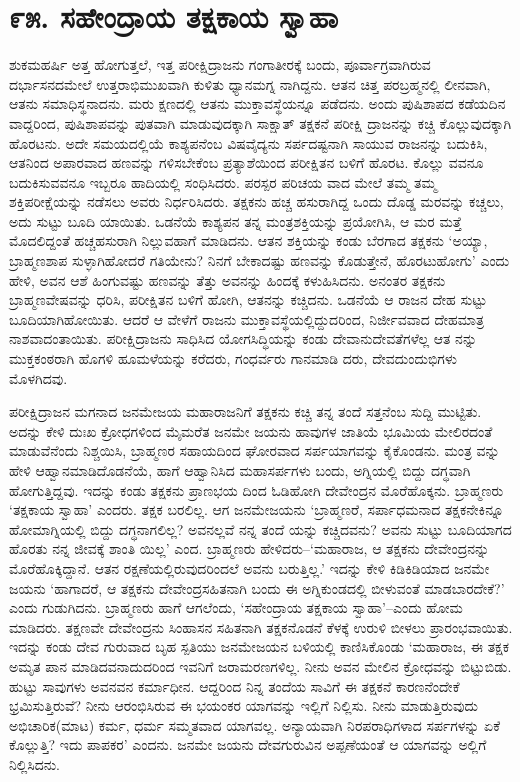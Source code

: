 
\chapter{೯೫. ಸಹೇಂದ್ರಾಯ ತಕ್ಷಕಾಯ ಸ್ವಾಹಾ}

ಶುಕಮಹರ್ಷಿ ಅತ್ತ ಹೋಗುತ್ತಲೆ, ಇತ್ತ ಪರೀಕ್ಷಿದ್ರಾಜನು ಗಂಗಾತೀರಕ್ಕೆ ಬಂದು, ಪೂರ್ವಾಗ್ರವಾಗಿರುವ ದರ್ಭಾಸನದಮೇಲೆ ಉತ್ತರಾಭಿಮುಖವಾಗಿ ಕುಳಿತು ಧ್ಯಾನಮಗ್ನ ನಾಗಿದ್ದನು. ಆತನ ಚಿತ್ತ ಪರಬ್ರಹ್ಮನಲ್ಲಿ ಲೀನವಾಗಿ, ಆತನು ಸಮಾಧಿಸ್ಥನಾದನು. ಮರು ಕ್ಷಣದಲ್ಲಿ ಆತನು ಮುಕ್ತಾವಸ್ಥೆಯನ್ನೂ ಪಡೆದನು. ಅಂದು ಪುಷಿಶಾಪದ ಕಡೆಯದಿನ ವಾದ್ದರಿಂದ, ಪುಷಿಶಾಪವನ್ನು ಪುತವಾಗಿ ಮಾಡುವುದಕ್ಕಾಗಿ ಸಾಕ್ಷಾತ್ ತಕ್ಷಕನೆ ಪರೀಕ್ಷಿ ದ್ರಾಜನನ್ನು ಕಚ್ಚಿ ಕೊಲ್ಲುವುದಕ್ಕಾಗಿ ಹೊರಟನು. ಅದೇ ಸಮಯದಲ್ಲಿಯೆ ಕಾಶ್ಯಪನೆಂಬ ವಿಷವೈದ್ಯನು ಸರ್ಪದಷ್ಟನಾಗಿ ಸಾಯುವ ರಾಜನನ್ನು ಬದುಕಿಸಿ, ಆತನಿಂದ ಅಪಾರವಾದ ಹಣವನ್ನು ಗಳಿಸಬೇಕೆಂಬ ಪ್ರತ್ಯಾಶೆಯಿಂದ ಪರೀಕ್ಷಿತನ ಬಳಿಗೆ ಹೊರಟ. ಕೊಲ್ಲು ವವನೂ ಬದುಕಿಸುವವನೂ ಇಬ್ಬರೂ ಹಾದಿಯಲ್ಲಿ ಸಂಧಿಸಿದರು. ಪರಸ್ಪರ ಪರಿಚಯ ವಾದ ಮೇಲೆ ತಮ್ಮ ತಮ್ಮ ಶಕ್ತಿಪರೀಕ್ಷೆಯನ್ನು ನಡೆಸಲು ಅವರು ನಿರ್ಧರಿಸಿದರು. ತಕ್ಷಕನು ಹಚ್ಚ ಹಸುರಾಗಿದ್ದ ಒಂದು ದೊಡ್ಡ ಮರವನ್ನು ಕಚ್ಚಲು, ಅದು ಸುಟ್ಟು ಬೂದಿ ಯಾಯಿತು. ಒಡನೆಯೆ ಕಾಶ್ಯಪನ ತನ್ನ ಮಂತ್ರಶಕ್ತಿಯನ್ನು ಪ್ರಯೋಗಿಸಿ, ಆ ಮರ ಮತ್ತೆ ಮೊದಲಿದ್ದಂತೆ ಹಚ್ಚಹಸುರಾಗಿ ನಿಲ್ಲುವಹಾಗೆ ಮಾಡಿದನು. ಆತನ ಶಕ್ತಿಯನ್ನು ಕಂಡು ಬೆರಗಾದ ತಕ್ಷಕನು ‘ಅಯ್ಯಾ, ಬ್ರಾಹ್ಮಣಶಾಪ ಸುಳ್ಳಾಗಿಹೋದರೆ ಗತಿಯೇನು? ನಿನಗೆ ಬೇಕಾದಷ್ಟು ಹಣವನ್ನು ಕೊಡುತ್ತೇನೆ, ಹೊರಟುಹೋಗು’ ಎಂದು ಹೇಳಿ, ಅವನ ಆಶೆ ಹಿಂಗುವಷ್ಟು ಹಣವನ್ನು ತೆತ್ತು ಅವನನ್ನು ಹಿಂದಕ್ಕೆ ಕಳುಹಿಸಿದನು. ಅನಂತರ ತಕ್ಷಕನು ಬ್ರಾಹ್ಮಣವೇಷವನ್ನು ಧರಿಸಿ, ಪರೀಕ್ಷಿತನ ಬಳಿಗೆ ಹೋಗಿ, ಆತನನ್ನು ಕಚ್ಚಿದನು. ಒಡನೆಯೆ ಆ ರಾಜನ ದೇಹ ಸುಟ್ಟು ಬೂದಿಯಾಗಿಹೋಯಿತು. ಆದರೆ ಆ ವೇಳೆಗೆ ರಾಜನು ಮುಕ್ತಾವಸ್ಥೆಯಲ್ಲಿದ್ದುದರಿಂದ, ನಿರ್ಜೀವವಾದ ದೇಹಮಾತ್ರ ನಾಶವಾದಂತಾಯಿತು. ಪರೀಕ್ಷಿದ್ರಾಜನು ಸಾಧಿಸಿದ ಯೋಗಸಿದ್ಧಿಯನ್ನು ಕಂಡು ದೇವಾನುದೇವತೆಗಳೆಲ್ಲ ಆತ ನನ್ನು ಮುಕ್ತಕಂಠರಾಗಿ ಹೊಗಳಿ ಹೂಮಳೆಯನ್ನು ಕರೆದರು, ಗಂಧರ್ವರು ಗಾನಮಾಡಿ ದರು, ದೇವದುಂದುಭಿಗಳು ಮೊಳಗಿದವು.

ಪರೀಕ್ಷಿದ್ರಾಜನ ಮಗನಾದ ಜನಮೇಜಯ ಮಹಾರಾಜನಿಗೆ ತಕ್ಷಕನು ಕಚ್ಚಿ ತನ್ನ ತಂದೆ ಸತ್ತನೆಂಬ ಸುದ್ದಿ ಮುಟ್ಟಿತು. ಅದನ್ನು ಕೇಳಿ ದುಃಖ ಕ್ರೋಧಗಳಿಂದ ಮೈಮರೆತ ಜನಮೇ ಜಯನು ಹಾವುಗಳ ಜಾತಿಯೆ ಭೂಮಿಯ ಮೇಲಿರದಂತೆ ಮಾಡುವೆನೆಂದು ನಿಶ್ಚಯಿಸಿ, ಬ್ರಾಹ್ಮಣರ ಸಹಾಯದಿಂದ ಘೋರವಾದ ಸರ್ಪಯಾಗವನ್ನು ಕೈಕೊಂಡನು. ಮಂತ್ರ ವನ್ನು ಹೇಳಿ ಆಹ್ವಾನಮಾಡಿದೊಡನೆಯೆ, ಹಾಗೆ ಆಹ್ವಾನಿಸಿದ ಮಹಾಸರ್ಪಗಳು ಬಂದು, ಅಗ್ನಿಯಲ್ಲಿ ಬಿದ್ದು ದಗ್ಧವಾಗಿ ಹೋಗುತ್ತಿದ್ದವು. ಇದನ್ನು ಕಂಡು ತಕ್ಷಕನು ಪ್ರಾಣಭಯ ದಿಂದ ಓಡಿಹೋಗಿ ದೇವೇಂದ್ರನ ಮೊರೆಹೊಕ್ಕನು. ಬ್ರಾಹ್ಮಣರು ‘ತಕ್ಷಕಾಯ ಸ್ವಾಹಾ’ ಎಂದರು. ತಕ್ಷಕ ಬರಲಿಲ್ಲ. ಆಗ ಜನಮೇಜಯನು ‘ಬ್ರಾಹ್ಮಣರೆ, ಸರ್ಪಾಧಮನಾದ ತಕ್ಷಕನೇಕಿನ್ನೂ ಹೋಮಾಗ್ನಿಯಲ್ಲಿ ಬಿದ್ದು ದಗ್ಧನಾಗಲಿಲ್ಲ? ಅವನಲ್ಲವೆ ನನ್ನ ತಂದೆ ಯನ್ನು ಕಚ್ಚಿದವನು? ಅವನು ಸುಟ್ಟು ಬೂದಿಯಾಗದ ಹೊರತು ನನ್ನ ಜೀವಕ್ಕೆ ಶಾಂತಿ ಯಿಲ್ಲ’ ಎಂದ. ಬ್ರಾಹ್ಮಣರು ಹೇಳಿದರು–‘ಮಹಾರಾಜ, ಆ ತಕ್ಷಕನು ದೇವೇಂದ್ರನನ್ನು ಮೊರೆಹೊಕ್ಕಿದ್ದಾನೆ. ಆತನ ರಕ್ಷಣೆಯಲ್ಲಿರುವುದರಿಂದಲೆ ಅವನು ಬರುತ್ತಿಲ್ಲ.’ ಇದನ್ನು ಕೇಳಿ ಕಿಡಿಕಿಡಿಯಾದ ಜನಮೇ ಜಯನು ‘ಹಾಗಾದರೆ, ಆ ತಕ್ಷಕನು ದೇವೇಂದ್ರಸಹಿತನಾಗಿ ಬಂದು ಈ ಅಗ್ನಿಕುಂಡದಲ್ಲಿ ಬೀಳುವಂತೆ ಮಾಡಬಾರದೇಕೆ?’ ಎಂದು ಗುಡುಗಿದನು. ಬ್ರಾಹ್ಮಣರು ಹಾಗೆ ಆಗಲೆಂದು, ‘ಸಹೇಂದ್ರಾಯ ತಕ್ಷಕಾಯ ಸ್ವಾಹಾ’–ಎಂದು ಹೋಮ ಮಾಡಿದರು. ತಕ್ಷಣವೇ ದೇವೇಂದ್ರನು ಸಿಂಹಾಸನ ಸಹಿತನಾಗಿ ತಕ್ಷಕನೊಡನೆ ಕೆಳಕ್ಕೆ ಉರುಳಿ ಬೀಳಲು ಪ್ರಾರಂಭವಾಯಿತು. ಇದನ್ನು ಕಂಡು ದೇವ ಗುರುವಾದ ಬೃಹ ಸ್ಪತಿಯು ಜನಮೇಜಯನ ಬಳಿಯಲ್ಲಿ ಕಾಣಿಸಿಕೊಂಡು ‘ಮಹಾರಾಜ, ಈ ತಕ್ಷಕ ಅಮೃತ ಪಾನ ಮಾಡಿದವನಾದುದರಿಂದ ಇವನಿಗೆ ಜರಾಮರಣಗಳಿಲ್ಲ. ನೀನು ಅವನ ಮೇಲಿನ ಕ್ರೋಧವನ್ನು ಬಿಟ್ಟುಬಿಡು. ಹುಟ್ಟು ಸಾವುಗಳು ಅವನವನ ಕರ್ಮಾಧೀನ. ಆದ್ದರಿಂದ ನಿನ್ನ ತಂದೆಯ ಸಾವಿಗೆ ಈ ತಕ್ಷಕನೆ ಕಾರಣನೆಂದೇಕೆ ಭ್ರಮಿಸುತ್ತಿರುವೆ? ನೀನು ಆರಂಭಿಸಿರುವ ಈ ಭಯಂಕರ ಯಾಗವನ್ನು ಇಲ್ಲಿಗೆ ನಿಲ್ಲಿಸು. ನೀನು ಮಾಡುತ್ತಿರುವುದು ಅಭಿಚಾರಿಕ(ಮಾಟ) ಕರ್ಮ, ಧರ್ಮ ಸಮ್ಮತವಾದ ಯಾಗವಲ್ಲ. ಅನ್ಯಾಯವಾಗಿ ನಿರಪರಾಧಿಗಳಾದ ಸರ್ಪಗಳನ್ನು ಏಕೆ ಕೊಲ್ಲುತ್ತಿ? ಇದು ಪಾಪಕರ’ ಎಂದನು. ಜನಮೇ ಜಯನು ದೇವಗುರುವಿನ ಅಪ್ಪಣೆಯಂತೆ ಆ ಯಾಗವನ್ನು ಅಲ್ಲಿಗೆ ನಿಲ್ಲಿಸಿದನು. 

